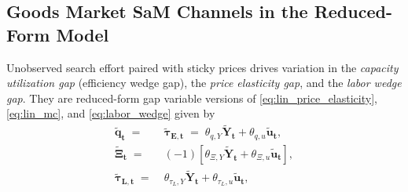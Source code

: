 \documentclass[12pt,3p,authoryear,review]{elsarticle}
\begin{document}
\subsection{Goods Market SaM Channels in the Reduced-Form Model}%
Unobserved search effort paired with sticky prices drives variation in the \emph{capacity utilization gap} (efficiency wedge gap), the \emph{price elasticity gap}, and the \emph{labor wedge gap}. They are reduced-form gap variable versions of \eqref{eq:lin_price_elasticity}, \eqref{eq:lin_mc}, and \eqref{eq:labor_wedge} given by%
\begin{align}%
	\boldsymbol{\tilde{q}_t} \; = & \; \boldsymbol{\tilde{\tau}_{E,t}} \; = \; \theta_{q,Y} \boldsymbol{\tilde{Y}_{t}} + \theta_{q,u} \boldsymbol{\tilde{u}_t},\label{eq:util_gap}\\%
	\boldsymbol{\tilde{\Xi}_{t}} \; = & \; \left(-1\right) \left[ \theta_{\Xi,Y} \boldsymbol{\tilde{Y}_{t}} + \theta_{\Xi,u} \boldsymbol{\tilde{u}_t} \right],\label{eq:price_elasticity_gap}\\%
	\boldsymbol{\tilde{\tau}_{L,t}} \; = & \; \theta_{\tau_L,Y} \boldsymbol{\tilde{Y}_{t}} + \theta_{\tau_L,u} \boldsymbol{\tilde{u}_t},\label{eq:labor_wedge_gap}%
\end{align}%
\end{document}
